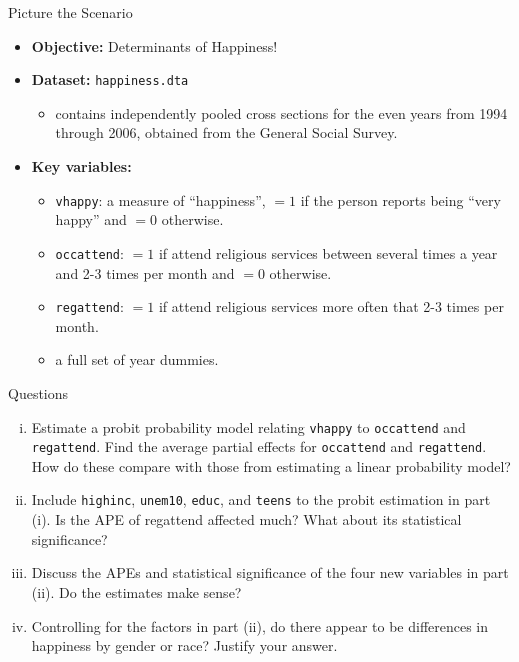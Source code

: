 \documentclass[
  10pt,
  ignorenonframetext,
]{beamer}
\providecommand{\tightlist}{%
  \setlength{\itemsep}{0pt}\setlength{\parskip}{0pt}}
\begin{document}
\begin{frame}[fragile]{Picture the Scenario}
\protect\hypertarget{picture-the-scenario-1}{}
\begin{itemize}
\item
  \textbf{Objective:} Determinants of Happiness!
\item
  \textbf{Dataset:} \texttt{happiness.dta}

  \begin{itemize}
  \tightlist
  \item
    contains independently pooled cross sections for the even years from
    1994 through 2006, obtained from the General Social Survey.
  \end{itemize}
\item
  \textbf{Key variables:}

  \begin{itemize}
  \tightlist
  \item
    \texttt{vhappy}: a measure of ``happiness'', \(= 1\) if the person
    reports being ``very happy'' and \(= 0\) otherwise.
  \item
    \texttt{occattend}: \(= 1\) if attend religious services between
    several times a year and 2-3 times per month and \(= 0\) otherwise.
  \item
    \texttt{regattend}: \(= 1\) if attend religious services more often
    that 2-3 times per month.
  \item
    a full set of year dummies.
  \end{itemize}
\end{itemize}
\end{frame}

\begin{frame}[fragile]{Questions}
\protect\hypertarget{questions-3}{}
\begin{enumerate}
[(i)]
\item
  Estimate a probit probability model relating \texttt{vhappy} to
  \texttt{occattend} and \texttt{regattend}. Find the average partial
  effects for \texttt{occattend} and \texttt{regattend}. How do these
  compare with those from estimating a linear probability model?
\item
  Include \texttt{highinc}, \texttt{unem10}, \texttt{educ}, and
  \texttt{teens} to the probit estimation in part (i). Is the APE of
  regattend affected much? What about its statistical significance?
\item
  Discuss the APEs and statistical significance of the four new
  variables in part (ii). Do the estimates make sense?
\item
  Controlling for the factors in part (ii), do there appear to be
  differences in happiness by gender or race? Justify your answer.
\end{enumerate}
\end{frame}
\end{document}
